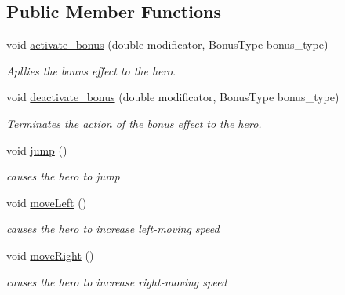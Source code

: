 \subsection*{Public Member Functions}
\begin{DoxyCompactItemize}
\item 
void \hyperlink{class_player_a18c12a3d320a15d87539cd6de2acca66}{activate\+\_\+bonus} (double modificator, Bonus\+Type bonus\+\_\+type)
\begin{DoxyCompactList}\small\item\em Apllies the bonus effect to the hero. \end{DoxyCompactList}\item 
void \hyperlink{class_player_a984c3a87de751efe818203bb01e8d5e9}{deactivate\+\_\+bonus} (double modificator, Bonus\+Type bonus\+\_\+type)
\begin{DoxyCompactList}\small\item\em Terminates the action of the bonus effect to the hero. \end{DoxyCompactList}\item 
\mbox{\label{class_player_a70e21ca98281b7d72f105f2693113d7e}} 
void \hyperlink{class_player_a70e21ca98281b7d72f105f2693113d7e}{jump} ()
\begin{DoxyCompactList}\small\item\em causes the hero to jump \end{DoxyCompactList}\item 
\mbox{\label{class_player_ae3bbcf1159bdc059bff1c2513f2505f7}} 
void \hyperlink{class_player_ae3bbcf1159bdc059bff1c2513f2505f7}{move\+Left} ()
\begin{DoxyCompactList}\small\item\em causes the hero to increase left-\/moving speed \end{DoxyCompactList}\item 
\mbox{\label{class_player_a6a2b68bc4b21d4c4a79a23b498896ec2}} 
void \hyperlink{class_player_a6a2b68bc4b21d4c4a79a23b498896ec2}{move\+Right} ()
\begin{DoxyCompactList}\small\item\em causes the hero to increase right-\/moving speed \end{DoxyCompactList}\item 
\mbox{\label{class_player_afebb6b7ca7210e7b1aa2c9ee4ff75b0e}} 

\end{DoxyCompactItemize}
